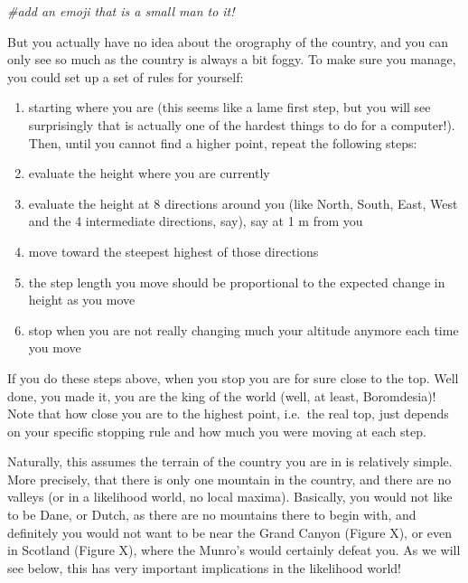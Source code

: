 \documentclass[
]{book}
\newenvironment{Shaded}{\begin{snugshade}}{\end{snugshade}}
\newcommand{\CommentTok}[1]{\textcolor[rgb]{0.56,0.35,0.01}{\textit{#1}}}
\providecommand{\tightlist}{%
  \setlength{\itemsep}{0pt}\setlength{\parskip}{0pt}}
\begin{document}
\begin{Shaded}
\begin{Highlighting}[]
\CommentTok{\#add an emoji that is a small man to it!}
\end{Highlighting}
\end{Shaded}

But you actually have no idea about the orography of the country, and you can only see so much as the country is always a bit foggy. To make sure you manage, you could set up a set of rules for yourself:

\begin{enumerate}
\def\labelenumi{\arabic{enumi}.}
\tightlist
\item
  starting where you are (this seems like a lame first step, but you will see surprisingly that is actually one of the hardest things to do for a computer!). Then, until you cannot find a higher point, repeat the following steps:
\item
  evaluate the height where you are currently
\item
  evaluate the height at 8 directions around you (like North, South, East, West and the 4 intermediate directions, say), say at 1 m from you
\item
  move toward the steepest highest of those directions
\item
  the step length you move should be proportional to the expected change in height as you move
\item
  stop when you are not really changing much your altitude anymore each time you move
\end{enumerate}

If you do these steps above, when you stop you are for sure close to the top. Well done, you made it, you are the king of the world (well, at least, Boromdesia)! Note that how close you are to the highest point, i.e.~the real top, just depends on your specific stopping rule and how much you were moving at each step.

Naturally, this assumes the terrain of the country you are in is relatively simple. More precisely, that there is only one mountain in the country, and there are no valleys (or in a likelihood world, no local maxima). Basically, you would not like to be Dane, or Dutch, as there are no mountains there to begin with, and definitely you would not want to be near the Grand Canyon (Figure X), or even in Scotland (Figure X), where the Munro's would certainly defeat you. As we will see below, this has very important implications in the likelihood world!
\end{document}
